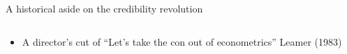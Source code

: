 \documentclass[notes,11pt, aspectratio=169]{beamer}
\begin{document}
\begin{frame}{A historical aside on the credibility revolution}
\begin{columns}[T] %
  \begin{column}{.4\textwidth}
    \begin{itemize}
    \item A director's cut of ``Let's take the con out of econometrics'' Leamer (1983)
    \end{itemize}
\end{column}%
\hfill%
\begin{column}{.6\textwidth}
  \vspace{-8pt}
  \begin{center}

\end{center}
\end{column}
\end{columns}
\end{frame}
\end{document}
